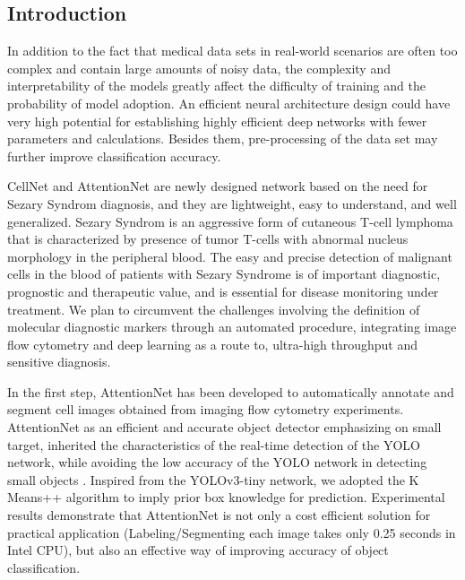 \subsection{Introduction}
\label{sec:Introduction}
In addition to the fact that medical data sets in real-world scenarios are often too complex and contain large amounts of noisy data, the complexity and interpretability of the models greatly affect the difficulty of training and the probability of model adoption.
An efficient neural architecture design could have very high potential for establishing highly efficient deep networks with fewer parameters and calculations\cite{19}. Besides them, pre-processing of the data set may further improve classification accuracy.
 
CellNet and AttentionNet are newly designed network based on the need for Sezary Syndrom diagnosis, and they are lightweight, easy to understand, and well generalized. Sezary Syndrom is an aggressive form of cutaneous T-cell lymphoma that is characterized by presence of tumor T-cells with abnormal nucleus morphology in the peripheral blood. The easy and precise detection of malignant cells in the blood of patients with Sezary Syndrome is of important diagnostic, prognostic and therapeutic value, and is essential for disease monitoring under treatment\cite{6}\cite{7}. We plan to circumvent the challenges involving the definition of molecular diagnostic markers through an automated procedure, integrating image flow cytometry and deep learning as a route to, ultra-high throughput and sensitive diagnosis.

In the first step, AttentionNet has been developed to automatically annotate and segment cell images obtained from imaging flow cytometry experiments. AttentionNet as an efficient and accurate object detector emphasizing on small target, inherited the characteristics of the real-time detection of the YOLO network, while avoiding the low accuracy of the YOLO network in detecting small objects \cite{33}. Inspired from the YOLOv3-tiny network\cite{18}, we adopted the K Means++ algorithm to imply prior box knowledge for prediction. Experimental results demonstrate that AttentionNet is not only a cost efficient solution for practical application (Labeling/Segmenting each image takes only 0.25 seconds in Intel CPU), but also an effective way of improving accuracy of object classification. 

